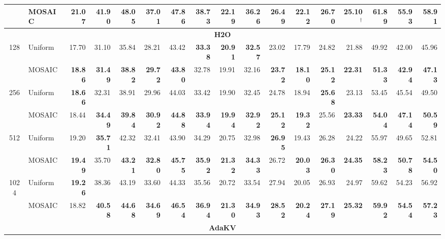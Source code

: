 \begin{table}[tp]
\begin{tabular}{@{} c l rrrr rrrr rrrr rrr @{}}
     & MOSAIC & \textbf{21.07} & 41.90 & \textbf{48.05} & \textbf{37.01} & \textbf{47.86} & \textbf{38.73} & \textbf{22.19} & \textbf{36.26} & \textbf{26.49} & 22.12 & \textbf{26.70} & \textbf{25.10}$^\dagger$ & \textbf{61.89} & \textbf{55.93} & \textbf{58.91} \\
    \midrule
    \multicolumn{17}{c}{\textbf{H2O}} \\
    \midrule
    \multirow{2}{*}{128} & Uniform & 17.70 & 31.10 & 35.84 & 28.21 & 43.42 & \textbf{33.38} & \textbf{20.91} & \textbf{32.57} & 23.02 & 17.79 & 24.82 & 21.88 & 49.92 & 42.00 & 45.96 \\
     & MOSAIC & \textbf{18.86} & \textbf{31.49} & \textbf{38.82} & \textbf{29.72} & \textbf{43.80} & 32.78 & 19.91 & 32.16 & \textbf{23.72} & \textbf{18.10} & \textbf{25.12} & \textbf{22.31} & \textbf{51.33} & \textbf{42.94} & \textbf{47.13} \\
    \cmidrule(l){1-17}
    \multirow{2}{*}{256} & Uniform & \textbf{18.66} & 32.31 & 38.91 & 29.96 & 44.03 & 33.42 & 19.90 & 32.45 & 24.78 & 18.94 & \textbf{25.68} & 23.13 & 53.45 & 45.54 & 49.50 \\
     & MOSAIC & 18.44 & \textbf{34.49} & \textbf{39.84} & \textbf{30.92} & \textbf{44.88} & \textbf{33.94} & \textbf{19.94} & \textbf{32.92} & \textbf{25.12} & \textbf{19.32} & 25.56 & \textbf{23.33} & \textbf{54.04} & \textbf{47.14} & \textbf{50.59} \\
    \cmidrule(l){1-17}
    \multirow{2}{*}{512} & Uniform & 19.20 & \textbf{35.71} & 42.32 & 32.41 & 43.90 & 34.29 & 20.75 & 32.98 & \textbf{26.95} & 19.43 & 26.28 & 24.22 & 55.97 & 49.65 & 52.81 \\
     & MOSAIC & \textbf{19.49} & 35.70 & \textbf{43.21} & \textbf{32.80} & \textbf{45.75} & \textbf{35.92} & \textbf{21.32} & \textbf{34.33} & 26.72 & \textbf{20.03} & \textbf{26.30} & \textbf{24.35} & \textbf{58.23} & \textbf{50.78} & \textbf{54.50} \\
    \cmidrule(l){1-17}
    \multirow{2}{*}{1024} & Uniform & \textbf{19.26} & 38.36 & 43.19 & 33.60 & 44.33 & 35.56 & 20.72 & 33.54 & 27.94 & 20.05 & 26.93 & 24.97 & 59.62 & 54.23 & 56.92 \\
     & MOSAIC & 18.82 & \textbf{40.58} & \textbf{44.68} & \textbf{34.69} & \textbf{46.54} & \textbf{36.94} & \textbf{21.30} & \textbf{34.93} & \textbf{28.52} & \textbf{20.24} & \textbf{27.19} & \textbf{25.32} & \textbf{59.92} & \textbf{54.54} & \textbf{57.23} \\
    \midrule
    \multicolumn{17}{c}{\textbf{AdaKV}} \\

\end{tabular}
\end{table}
